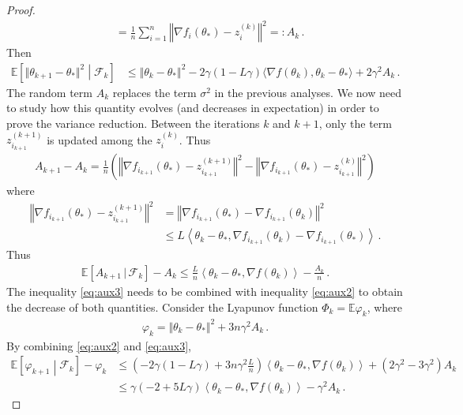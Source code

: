 \documentclass[11pt,reqno]{article}
\newcommand{\E}{\mathbb{E}}
\newcommand{\cF}{\mathcal{F}}
\renewcommand{\leq}{\leqslant}
\numberwithin{equation}{section}
\theoremstyle{plain}
\theoremstyle{definition}
\theoremstyle{remark}
\begin{document}
\begin{proof}
\begin{align*}
	&= \frac{1}{n} \sum_{i=1}^{n} \left\Vert \nabla f_i(\theta_*) - z_i^{(k)} \right\Vert^2 =: A_k \, .
\end{align*}
Then 
\begin{align}
	\label{eq:aux2}
	\E\left[\Vert \theta_{k+1} - \theta_* \Vert^2 \middle\vert \cF_k\right] &\leq \Vert \theta_k - \theta_* \Vert^2 - 2\gamma(1-L\gamma) \langle \nabla f(\theta_k), \theta_k - \theta_* \rangle + 2\gamma^2 A_k \, .
\end{align}
The random term $A_k$ replaces the term $\sigma^2$ in the previous analyses. We now need to study how this quantity evolves (and decreases in expectation) in order to prove the variance reduction. Between the iterations $k$ and $k+1$, only the term $z_{i_{k+1}}^{(k+1)}$ is updated among the $z_i^{(k)}$. Thus 
\begin{align*}
	A_{k+1}-A_k = \frac{1}{n} \left(\left\Vert \nabla f_{i_{k+1}}(\theta_*) - z^{(k+1)}_{i_{k+1}}\right\Vert^2 - \left\Vert \nabla f_{i_{k+1}}(\theta_*) - z^{(k)}_{i_{k+1}}\right\Vert^2\right)
\end{align*}
where 
\begin{align*}
	\left\Vert \nabla f_{i_{k+1}}(\theta_*) - z^{(k+1)}_{i_{k+1}}\right\Vert^2 &= \left\Vert \nabla f_{i_{k+1}}(\theta_*) - \nabla f_{i_{k+1}}(\theta_k)\right\Vert^2 \\
	&\leq L \left\langle \theta_k - \theta_*, \nabla f_{i_{k+1}}(\theta_k) - \nabla f_{i_{k+1}}(\theta_*) \right\rangle \, .
\end{align*}
Thus 
\begin{align}
	\label{eq:aux3}
	\E [A_{k+1} \, \vert\,  \cF_k] - A_k \leq \frac{L}{n} \left\langle \theta_k - \theta_*, \nabla f(\theta_k) \right\rangle - \frac{A_k}{n} \, .
\end{align}
The inequality \eqref{eq:aux3} needs to be combined with inequality \eqref{eq:aux2} to obtain the decrease of both quantities. Consider the Lyapunov function $\Phi_k = \E \varphi_k$, where 
\begin{align*}
	\varphi_k = \Vert \theta_k - \theta_* \Vert^2 + 3n \gamma^2 A_k \, .
\end{align*}
By combining \eqref{eq:aux2} and \eqref{eq:aux3}, 
\begin{align*}
	\E \left[\varphi_{k+1}\middle\vert  \cF_k\right] - \varphi_k &\leq \left(- 2\gamma(1-L\gamma) + 3n\gamma^2 \frac{L}{n}\right) \left\langle \theta_k - \theta_*, \nabla f(\theta_k) \right\rangle + (2\gamma^2 - 3\gamma^2) A_k \\
	&\leq \gamma(-2+5L\gamma) \left\langle \theta_k - \theta_*, \nabla f(\theta_k) \right\rangle - \gamma^2 A_k \, . 

\end{align*}
\end{proof}
\end{document}
